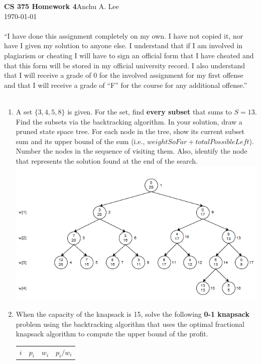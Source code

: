 \documentclass{article}
\begin{document}
\noindent\textbf{CS 375 Homework 4}\hfill Anchu A. Lee\\
\noindent\today
\\\\“I have done this assignment completely on my own. I have not copied it, nor have I given my solution to anyone else. I understand that if I am involved in plagiarism or cheating I will have to sign an official form that I have cheated and that this form will be stored in my official university record. I also understand that I will receive a grade of 0 for the involved assignment for my first offense and that I will receive a grade of “F” for the course for any additional offense.” 
\\\\
\begin{enumerate}
    \item A set $\{3, 4, 5, 8\}$ is given. For the set, find \textbf{every 
    subset} that sums to $S = 13$. Find the subsets via the backtracking 
    algorithm. In your solution, draw a pruned state space tree. For each node 
    in the tree, show its current subset sum and its upper bound of the sum 
    (i.e., $weightSoFar + totalPossibleLeft$). Number the nodes in the 
    sequence of visiting them. Also, identify the node that represents the 
    solution found at the end of the search.\newline
    \includegraphics[scale=0.8]{p1_tree}
    \item When the capacity of the knapsack is 15, solve the following 
    \textbf{0-1 knapsack} problem using the backtracking algorithm that uses 
    the optimal fractional knapsack algorithm to compute the upper bound of 
    the profit.\newline
    \begin{tabular}{c c c c}
        $i$ & $p_i$ & $w_i$ & $p_i / w_i$\\

\end{tabular}
\end{enumerate}
\end{document}
